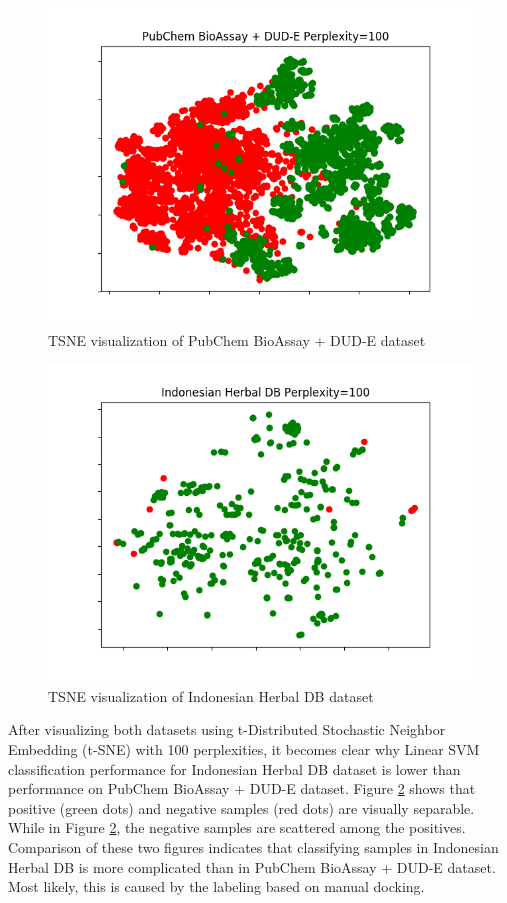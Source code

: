 \documentclass[conference]{IEEEtran}
\begin{document}
\begin{figure}
	\includegraphics[scale=0.45]{../images/visualize-dataset_tsne_pubchem_100.png}
	\caption{TSNE visualization of PubChem BioAssay + DUD-E dataset}
	\label{fig_tsne_pubchem}
\end{figure}

\begin{figure}
	\includegraphics[scale=0.45]{../images/visualize-dataset_tsne_herbaldb_expanded_100.png}
	\caption{TSNE visualization of Indonesian Herbal DB dataset}
	\label{fig_tsne_herbaldb}
\end{figure}	

After visualizing both datasets using t-Distributed Stochastic Neighbor Embedding (t-SNE) \cite{maaten2008visualizing} with 100 perplexities, it becomes clear why Linear SVM classification performance for Indonesian Herbal DB dataset is lower than performance on PubChem BioAssay + DUD-E dataset. Figure \ref{fig_tsne_herbaldb} shows that positive (green dots) and negative samples (red dots) are visually separable. While in Figure \ref{fig_tsne_herbaldb}, the negative samples are scattered among the positives. Comparison of these two figures indicates that classifying samples in Indonesian Herbal DB is more complicated than in PubChem BioAssay + DUD-E dataset. Most likely, this is caused by the labeling based on manual docking.
\end{document}
